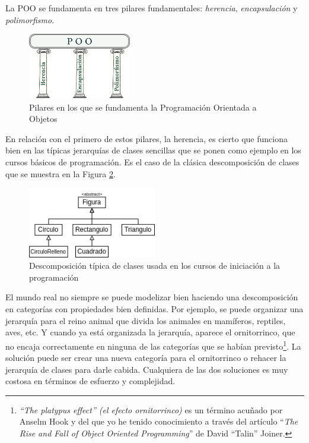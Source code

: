 La POO se fundamenta en tres pilares fundamentales: \textit{herencia}, \textit{encapsulación} y  \textit{polimorfismo}.

\vspace{0.7em}
\begin{figure}[htb]
   \begin{center}
      \includegraphics[width=0.4\textwidth]{img/pilares_1.png}
      \caption{Pilares en los que se fundamenta la Programación Orientada a Objetos}
      \label{fig_pilares_1}
   \end{center}
\end{figure}

En relación con el primero de estos pilares, la herencia, es cierto que funciona bien en las típicas jerarquías de clases sencillas que se ponen como ejemplo en los cursos básicos de programación. Es el caso de la clásica descomposición de clases que se muestra en la Figura \ref{fig_figuras}.

\vspace{0.7em}
\begin{figure}[htb]
   \begin{center}
      \includegraphics[width=0.5\textwidth]{img/figuras.png}
      \caption{Descomposición típica de clases usada en los cursos de iniciación a la programación}
      \label{fig_figuras}
   \end{center}
\end{figure}
 

El mundo real no siempre se puede modelizar bien haciendo una descomposición en categorías con propiedades bien definidas. Por ejemplo, se puede organizar una jerarquía para el reino animal que divida los animales en mamíferos, reptiles, aves, etc. Y cuando ya está organizada la jerarquía, aparece el ornitorrinco, que no encaja correctamente en ninguna de las categorías que se habían previsto\footnote{\textit{``The platypus effect'' (el efecto ornitorrinco)} es un término acuñado por Anselm Hook y del que yo he tenido conocimiento a través del artículo ``\textit{The Rise and Fall of Object Oriented Programming}'' de David ``Talin'' Joiner.}. La solución puede ser crear una nueva categoría para el ornitorrinco o rehacer la jerarquía de clases para darle cabida. Cualquiera de las dos soluciones es muy costosa en términos de esfuerzo y complejidad.

